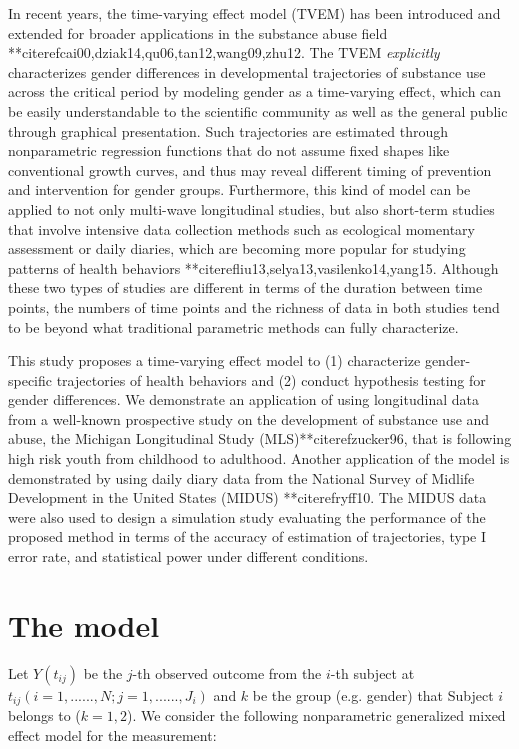 In recent years, the time-varying effect model (TVEM) has been
introduced and extended for broader applications in the substance
abuse field **citeref{cai00,dziak14,qu06,tan12,wang09,zhu12}. The TVEM
\emph{explicitly} characterizes gender differences in
developmental trajectories of substance use across the critical
period by modeling gender as a time-varying effect, which can be
easily understandable to the scientific community as well as the
general public through graphical presentation. Such trajectories
are estimated through nonparametric regression functions that do
not assume fixed shapes like conventional growth curves, and thus
may reveal different timing of prevention and intervention for
gender groups. Furthermore, this kind of model can be applied to
not only multi-wave longitudinal studies, but also short-term
studies that involve intensive data collection methods such as
ecological momentary assessment or daily diaries, which are
becoming more popular for studying patterns of health behaviors
**citeref{liu13,selya13,vasilenko14,yang15}. Although these two types
of studies are different in terms of the duration between time
points, the numbers of time points and the richness of data in
both studies tend to be beyond what traditional parametric methods
can fully characterize.

This study proposes a time-varying effect model to (1)
characterize gender-specific trajectories of health behaviors and
(2) conduct hypothesis testing for gender differences. We
demonstrate an application of 
using longitudinal data
from a well-known prospective study on the development of
substance use and abuse, the Michigan Longitudinal Study
(MLS)**citeref{zucker96}, that is following high risk youth from
childhood to adulthood. Another application of the model is
demonstrated by using daily diary data from the National Survey of
Midlife Development in the United States (MIDUS) **citeref{ryff10}.
The MIDUS data were also used to design a simulation study
evaluating the performance of the proposed method in terms of the
accuracy of estimation of trajectories, type I error rate, and
statistical power under different conditions.


\section{The model}

Let $Y(t_{ij})$ be the $j$-th observed outcome from the $i$-th
subject at $t_{ij} (i=1,......,N; j=1,......,J_i)$ and $k$ be the
group (e.g. gender) that Subject $i$ belongs to ($k=1,2$). We
consider the following nonparametric generalized mixed effect
model for the measurement:

